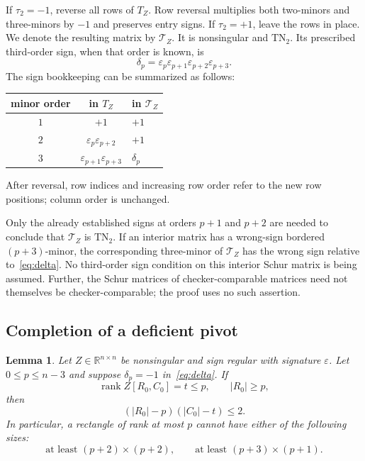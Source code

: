 \documentclass[11pt]{article}
\newtheorem{lemma}[theorem]{Lemma}
\theoremstyle{definition}
\theoremstyle{remark}
\numberwithin{equation}{section}
\newcommand{\R}{\mathbb R}
\newcommand{\eps}{\varepsilon}
\DeclareMathOperator{\rank}{rank}
\begin{document}
If $\tau_2=-1$, reverse all rows of $T_Z$. Row reversal multiplies
both two-minors and three-minors by $-1$ and preserves entry signs.
If $\tau_2=+1$, leave the rows in place. We denote the resulting
matrix by $\mathcal T_Z$. It is nonsingular and $\mathrm{TN}_2$.
Its prescribed third-order sign, when that order is known, is
\begin{equation}\label{eq:delta}
 \delta_p=\eps_p\eps_{p+1}\eps_{p+2}\eps_{p+3}.
\end{equation}
The sign bookkeeping can be summarized as follows:
\begin{center}
\begin{tabular}{ccl}
\toprule
minor order & in $T_Z$ & in $\mathcal T_Z$\\
\midrule
$1$ & $+1$ & $+1$\\
$2$ & $\eps_p\eps_{p+2}$ & $+1$\\
$3$ & $\eps_{p+1}\eps_{p+3}$ & $\delta_p$\\
\bottomrule
\end{tabular}
\end{center}
After reversal, row indices and increasing row order refer to the
new row positions; column order is unchanged.

Only the already established signs at orders $p+1$ and $p+2$ are
needed to conclude that $\mathcal T_Z$ is $\mathrm{TN}_2$.
If an interior matrix has a wrong-sign bordered $(p+3)$-minor,
the corresponding three-minor of $\mathcal T_Z$ has the wrong sign
relative to~\eqref{eq:delta}. No third-order sign condition on this
interior Schur matrix is being assumed. Further, the Schur matrices
of checker-comparable matrices need not themselves be
checker-comparable; the proof uses no such assertion.

\subsection{Completion of a deficient pivot}

\begin{lemma}\label{lem:rank-obstruction}
Let $Z\in\R^{n\times n}$ be nonsingular and sign regular with
signature $\eps$. Let $0\leq p\leq n-3$ and suppose
$\delta_p=-1$ in~\eqref{eq:delta}. If
\[
 \rank Z[R_0,C_0]=t\leq p,\qquad |R_0|\geq p,
\]
then
\begin{equation}\label{eq:zero-area}
 (|R_0|-p)(|C_0|-t)\leq2.
\end{equation}
In particular, a rectangle of rank at most $p$ cannot have either
of the following sizes:
\begin{equation}\label{eq:forbidden-sizes}
 \text{at least }(p+2)\times(p+2),\qquad
 \text{at least }(p+3)\times(p+1).
\end{equation}
\end{lemma}
\end{document}
